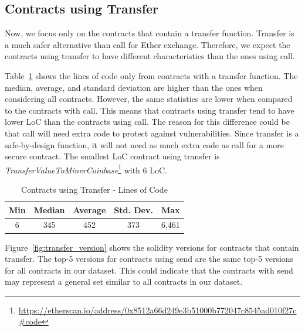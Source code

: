 \documentclass[10pt,conference]{IEEEtran}
\begin{document}
\subsection{Contracts using Transfer}

Now, we focus only on the contracts that contain a transfer function. Transfer is a much safer alternative than call for Ether exchange. Therefore, we expect the contracts using transfer to have different characteristics than the ones using call.

Table~\ref{tab:transfer-loc} shows the lines of code only from contracts with a transfer function. The median, average, and standard deviation are higher than the ones when considering all contracts. However, the same statistics are lower when compared to the contracts with call. This means that contracts using transfer tend to have lower LoC than the contracts using call. The reason for this difference could be that call will need extra code to protect against vulnerabilities. Since transfer is a safe-by-design function, it will not need as much extra code as call for a more secure contract. The smallest LoC contract using transfer is \textit{TransferValueToMinerCoinbase}\footnote{\url{https://etherscan.io/address/0x8512a66d249e3b51000b772047c8545ad010f27c\#code}} with 6 LoC.

\begin{table}[t]
\center
  \caption{Contracts using Transfer - Lines of Code}
  \label{tab:transfer-loc}
  \begin{tabular}{c c c c c}
    \hline
    Min & Median & Average & Std. Dev. & Max \\
    \hline
   6 & 345 & 452 & 373 & 6,461 \\
  \hline
\end{tabular}
\end{table}

Figure~\ref{fig:transfer_version} shows the solidity versions for contracts that contain transfer.  The top-5 versions for contracts using send are the same top-5 versions for all contracts in our dataset.  This could indicate that the contracts with send may represent a general set similar to all contracts in our dataset.
\end{document}
